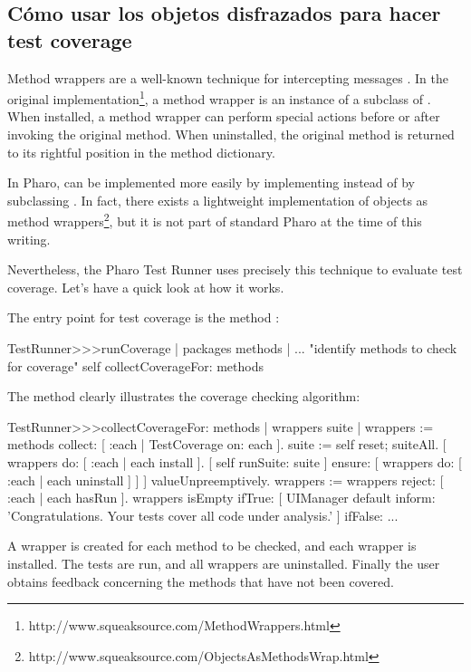\documentclass[a4paper,10pt,twoside]{book}
\begin{document}
{\subsection{Cómo usar los objetos disfrazados para hacer  test coverage}


Method wrappers are a well-known technique for intercepting messages \cite{Bran98a}.
In the original implementation\footnote{http://www.squeaksource.com/MethodWrappers.html}, a method wrapper is an instance of a subclass of . When installed, a method wrapper can perform special actions before or after invoking the original method.
When uninstalled, the original method is returned to its rightful position in the method dictionary.

In Pharo,  can be implemented more easily by implementing  instead of by subclassing . In fact, there exists a lightweight implementation of objects as method wrappers\footnote{http://www.squeaksource.com/ObjectsAsMethodsWrap.html}, but it is not part of standard Pharo at the time of this writing.

Nevertheless, the Pharo Test Runner uses precisely this technique to evaluate test coverage.
Let's have a quick look at how it works.

The entry point for test coverage is the method :
\begin{code}{}
TestRunner>>>runCoverage
        | packages methods |
        ... "identify methods to check for coverage"
        self collectCoverageFor: methods
\end{code}

The method  clearly illustrates the coverage checking algorithm:
\begin{code}{}
TestRunner>>>collectCoverageFor: methods
        | wrappers suite |
        wrappers := methods collect: [ :each | TestCoverage on: each ].
        suite := self
                reset;
                suiteAll.
        [ wrappers do: [ :each | each install ].
          [ self runSuite: suite ] ensure: [ wrappers do: [ :each | each uninstall ] ] ] valueUnpreemptively.
        wrappers := wrappers reject: [ :each | each hasRun ].
        wrappers isEmpty
                ifTrue:
                        [ UIManager default inform: 'Congratulations. Your tests cover all code under analysis.' ]
                ifFalse: ...
\end{code}
A wrapper is created for each method to be checked, and each wrapper is installed.
The tests are run, and all wrappers are uninstalled.
Finally the user obtains feedback concerning the methods that have not been covered.

}
\end{document}
